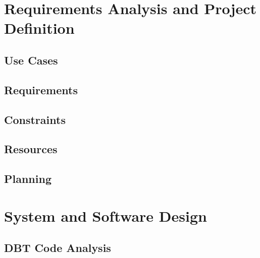 \documentclass[12pt]{article}
\begin{document}
\section{Requirements Analysis and Project Definition}


\subsection{Use Cases}


\subsection{Requirements}


\subsection{Constraints}


\subsection{Resources}

\subsection{Planning}


\newpage
\section{System and Software Design}

\subsection {DBT Code Analysis}

\end{document}
